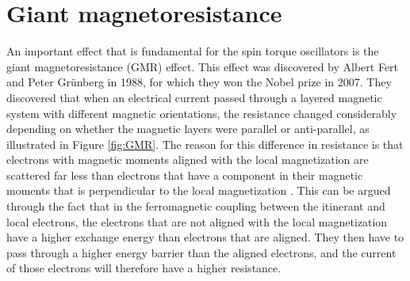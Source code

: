 \section{Giant magnetoresistance}
An important effect that is fundamental for the spin torque oscillators is the giant magnetoresistance (GMR) effect. This effect was discovered by Albert Fert \cite{Fert1988} and Peter Gr\"{u}nberg \cite{Grunberg1989} in 1988, for which they won the Nobel prize in 2007. They discovered that when an electrical current passed through a layered magnetic system with different magnetic orientations, the resistance changed considerably depending on whether the magnetic layers were parallel or anti-parallel, as illustrated in Figure \ref{fig:GMR}. The reason for this difference in resistance is that electrons with magnetic moments aligned with the local magnetization are scattered far less than electrons that have a component in their magnetic moments that is perpendicular to the local magnetization \cite{Chappert2007}. This can be argued through the fact that in the ferromagnetic coupling between the itinerant and local electrons, the electrons that are not aligned with the local magnetization have a higher exchange energy than electrons that are aligned. They then have to pass through a higher energy barrier than the aligned electrons, and the current of those electrons will therefore have a higher resistance.
